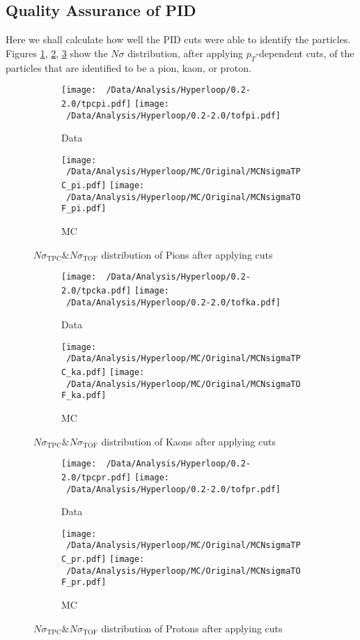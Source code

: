 \documentclass[12pt,a4paper,twoside]{report}
\begin{document}
\subsection{Quality Assurance of PID}
Here we shall calculate how well the PID cuts were able to identify the particles. Figures \ref{Pion_nsigma}, \ref{Kaon_nsigma}, \ref{Proton_nsigma} show the $N\sigma$ distribution, after applying $p_{T}$-dependent cuts, of the particles that are identified to be a pion, kaon, or proton. 
\begin{figure}[H]
	\begin{subfigure}{\linewidth}
	\texttt{[image: ~/Data/Analysis/Hyperloop/0.2-2.0/tpcpi.pdf]}
	\texttt{[image: ~/Data/Analysis/Hyperloop/0.2-2.0/tofpi.pdf]}
	\caption{Data}
	\end{subfigure}
	\begin{subfigure}{\linewidth}
	\texttt{[image: ~/Data/Analysis/Hyperloop/MC/Original/MCNsigmaTPC\_pi.pdf]}
	\texttt{[image: ~/Data/Analysis/Hyperloop/MC/Original/MCNsigmaTOF\_pi.pdf]}
	\caption{MC}
	\end{subfigure}
	\caption{\label{Pion_nsigma}$N\sigma_\mathrm{TPC}\&N\sigma_\mathrm{TOF}$ distribution of Pions after applying cuts}
\end{figure}
\begin{figure}[H]
	\begin{subfigure}{\linewidth}
	\texttt{[image: ~/Data/Analysis/Hyperloop/0.2-2.0/tpcka.pdf]}
	\texttt{[image: ~/Data/Analysis/Hyperloop/0.2-2.0/tofka.pdf]}
	\caption{Data}
	\end{subfigure}
	\begin{subfigure}{\linewidth}
	\texttt{[image: ~/Data/Analysis/Hyperloop/MC/Original/MCNsigmaTPC\_ka.pdf]}
	\texttt{[image: ~/Data/Analysis/Hyperloop/MC/Original/MCNsigmaTOF\_ka.pdf]}
	\caption{MC}
	\end{subfigure}
	\caption{\label{Kaon_nsigma}$N\sigma_\mathrm{TPC}\&N\sigma_\mathrm{TOF}$ distribution of Kaons after applying cuts}
\end{figure}
\begin{figure}[H]
	\begin{subfigure}{\linewidth}
	\texttt{[image: ~/Data/Analysis/Hyperloop/0.2-2.0/tpcpr.pdf]}
	\texttt{[image: ~/Data/Analysis/Hyperloop/0.2-2.0/tofpr.pdf]}
	\caption{Data}
	\end{subfigure}
	\begin{subfigure}{\linewidth}
	\texttt{[image: ~/Data/Analysis/Hyperloop/MC/Original/MCNsigmaTPC\_pr.pdf]}
	\texttt{[image: ~/Data/Analysis/Hyperloop/MC/Original/MCNsigmaTOF\_pr.pdf]}
	\caption{MC}
	\end{subfigure}
	\caption{\label{Proton_nsigma}$N\sigma_\mathrm{TPC}\&N\sigma_\mathrm{TOF}$ distribution of Protons after applying cuts}
\end{figure}
\end{document}
